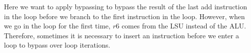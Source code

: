 Here we want to apply bypassing to bypass the result of the last add instruction in the loop before we branch to the first instruction in the loop. However, when we go in the loop for the first time, $r6$ comes from the LSU instead of the ALU. Therefore, sometimes it is necessary to insert an instruction before we enter a loop to bypass over loop iterations.







